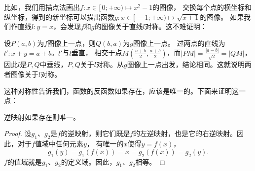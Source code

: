 \documentclass[12pt,UTF8,fontset=none]{ctexbook}
\begin{document}
比如，我们用描点法画出$f: x\in[\,0;+\infty) \mapsto x^2 - 1$的图像，
交换每个点的横坐标和纵坐标，得到的新坐标可以描出函数$g:x\in[\,-1;+\infty)\mapsto\sqrt{x + 1}$的图像。
如果我们作直线$l: y = x$，会发现$f$和$g$的图像关于直线$l$对称。这不难证明：

设$P(a,b)$为$f$图像上一点，则$Q(b,a)$为$g$图像上一点。
过两点的直线为$l':x + y = a + b$。$l'$与$l$垂直，
相交于点$M(\frac{a+b}{2}, \frac{a+b}{2})$，而$|PM| = \frac{|a-b|}{\sqrt{2}} = |QM|$，
因此$l$是$P,Q$中垂线，$P,Q$关于$l$对称。从$g$图像上一点出发，结论相同。这就说明两者图像关于$l$对称。

这种对称性告诉我们，函数的反函数如果存在，应该是唯一的。下面来证明这一点：

\begin{tm}[逆映射的唯一性]
    逆映射如果存在则唯一。
\end{tm}
\begin{proof}
    设$g_1$、$g_2$是$f$的逆映射，则它们既是$f$的左逆映射，也是它的右逆映射。因此，对于$f$值域中任何元素$y$，
    有唯一的$x$使得$y = f(x)$，
    $$ g_1(y) = g_1(f(x)) = x = g_2(f(x)) = g_2(y).$$
    $f$的值域就是$g_1$、$g_2$的定义域。因此，$g_1$、$g_2$相等。
\end{proof}
\end{document}
